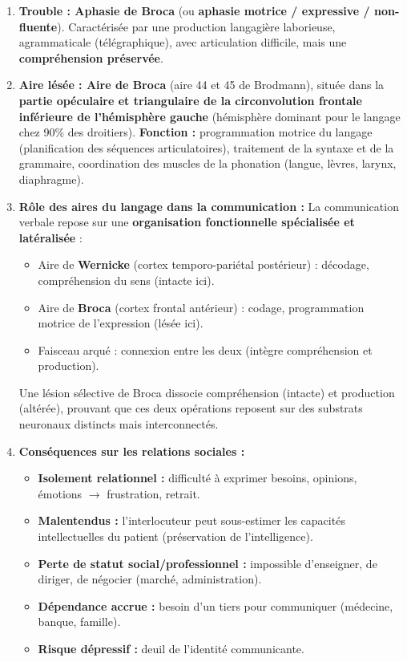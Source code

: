 \documentclass[11pt]{article}
\begin{document}
\begin{corrige}
\begin{enumerate}
\item \textbf{Trouble : Aphasie de Broca} (ou \textbf{aphasie motrice / expressive / non-fluente}). Caractérisée par une production langagière laborieuse, agrammaticale (télégraphique), avec articulation difficile, mais une \textbf{compréhension préservée}.
\item \textbf{Aire lésée : Aire de Broca} (aire 44 et 45 de Brodmann), située dans la \textbf{partie opéculaire et triangulaire de la circonvolution frontale inférieure de l'hémisphère gauche} (hémisphère dominant pour le langage chez 90\% des droitiers). \textbf{Fonction :} programmation motrice du langage (planification des séquences articulatoires), traitement de la syntaxe et de la grammaire, coordination des muscles de la phonation (langue, lèvres, larynx, diaphragme).
\item \textbf{Rôle des aires du langage dans la communication :} La communication verbale repose sur une \textbf{organisation fonctionnelle spécialisée et latéralisée} :
\begin{itemize}
\item Aire de \textbf{Wernicke} (cortex temporo-pariétal postérieur) : décodage, compréhension du sens (intacte ici).
\item Aire de \textbf{Broca} (cortex frontal antérieur) : codage, programmation motrice de l'expression (lésée ici).
\item Faisceau arqué : connexion entre les deux (intègre compréhension et production).
\end{itemize}
Une lésion sélective de Broca dissocie compréhension (intacte) et production (altérée), prouvant que ces deux opérations reposent sur des substrats neuronaux distincts mais interconnectés.
\item \textbf{Conséquences sur les relations sociales :}
\begin{itemize}
\item \textbf{Isolement relationnel :} difficulté à exprimer besoins, opinions, émotions $\to$ frustration, retrait.
\item \textbf{Malentendus :} l'interlocuteur peut sous-estimer les capacités intellectuelles du patient (préservation de l'intelligence).
\item \textbf{Perte de statut social/professionnel :} impossible d'enseigner, de diriger, de négocier (marché, administration).
\item \textbf{Dépendance accrue :} besoin d'un tiers pour communiquer (médecine, banque, famille).
\item \textbf{Risque dépressif :} deuil de l'identité communicante.
\end{itemize}
\end{enumerate}
\end{corrige}
\end{document}
